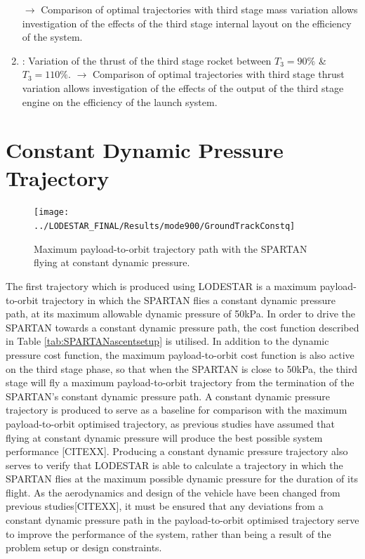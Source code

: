 \begin{enumerate}
	\newline$\rightarrow$ Comparison of optimal trajectories with third stage mass variation allows investigation of the effects of the third stage internal layout on the efficiency of the system. 
	\item: Variation of the thrust of the third stage rocket between $T_3 = 90\%$ \& $T_3 = 110\%$. 
	\newline$\rightarrow$ Comparison of optimal trajectories with third stage thrust variation allows investigation of the effects of the output of the third stage engine on the efficiency of the launch system. 
\end{enumerate}

\section{Constant Dynamic Pressure Trajectory}
\begin{figure}[ht]
	\centering
	\texttt{[image: ../LODESTAR\_FINAL/Results/mode900/GroundTrackConstq]}
	\caption{Maximum payload-to-orbit trajectory path with the SPARTAN flying at constant dynamic pressure.}
	\label{fig:GroundTrackConstq}
\end{figure}

The first trajectory which is produced using LODESTAR is a maximum payload-to-orbit trajectory in which the SPARTAN flies a constant dynamic pressure path, at its maximum allowable dynamic pressure of 50kPa. In order to drive the SPARTAN towards a constant dynamic pressure path, the cost function described in Table \ref{tab:SPARTANascentsetup} is utilised. In addition to the dynamic pressure cost function, the maximum payload-to-orbit cost function is also active on the third stage phase, so that when the SPARTAN is close to 50kPa, the third stage will fly a maximum payload-to-orbit trajectory from the termination of the SPARTAN's constant dynamic pressure path.
A constant dynamic pressure trajectory is produced to serve as a baseline for comparison with the maximum payload-to-orbit optimised trajectory, as previous studies have assumed that flying at constant dynamic pressure will produce the best possible system performance [CITEXX]. Producing a constant dynamic pressure trajectory also serves to verify that LODESTAR is able to calculate a trajectory in which the SPARTAN flies at the maximum possible dynamic pressure for the duration of its flight. As the aerodynamics and design of the vehicle have been changed from previous studies[CITEXX], it must be ensured that any deviations from a constant dynamic pressure path in the payload-to-orbit optimised trajectory serve to improve the performance of the system, rather than being a result of the problem setup or design constraints. 


